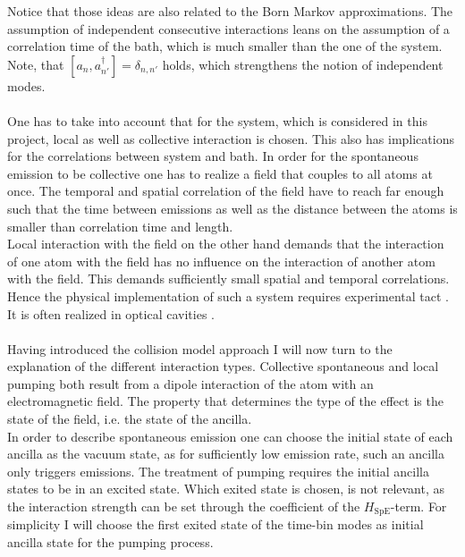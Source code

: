 Notice that those ideas are also related to the Born Markov approximations. The assumption of independent consecutive interactions leans on the assumption of a correlation time of the bath, which is much smaller than the one of the system. Note, that $[a_n,a^\dagger_{n'}]=\delta_{n,n'}$ holds, which strengthens the notion of independent modes.\\\\%
One has to take into account that for the system, which is considered in this project, local as well as collective interaction is chosen. This also has implications for the correlations between system and bath.
In order for the spontaneous emission to be collective one has to realize a field that couples to all atoms at once. The temporal and spatial correlation of the field have to reach far enough such that the time between emissions as well as the distance between the atoms is smaller than correlation time and length. \\Local interaction with the field on the other hand demands that the interaction of one atom with the field has no influence on the interaction of another atom with the field. This demands sufficiently small spatial and temporal correlations. Hence the physical implementation of such a system requires experimental tact \cite{diehl_quantum_2008}. It is often realized in optical cavities \cite{}.\\\\%
Having introduced the collision model approach I will now turn to the explanation of the different interaction types. Collective spontaneous and local pumping both result from a dipole interaction of the atom with an electromagnetic field. The property that determines the type of the effect is the state of the field, i.e. the state of the ancilla.\\
In order to describe spontaneous emission one can choose the initial state of each ancilla as the vacuum state, as for sufficiently low emission rate, such an ancilla only triggers emissions. The treatment of pumping requires the initial ancilla states to be in an excited state. Which exited state is chosen, is not relevant, as the interaction strength can be set through the coefficient of the $H_\text{SpE}$-term. For simplicity I will choose the first exited state of the time-bin modes as initial ancilla state for the pumping process. \\\\
